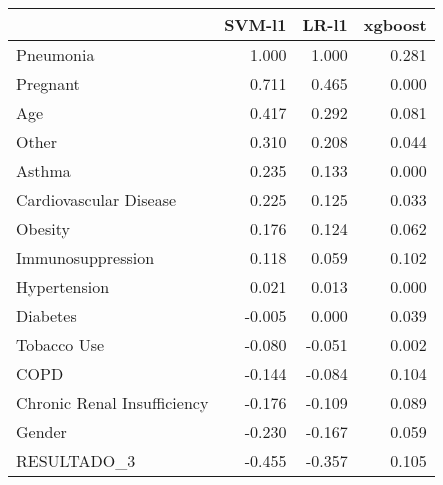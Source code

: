\begin{tabular}{lrrr}
\toprule
{} &  SVM-l1 &  LR-l1 &  xgboost \\
\midrule
Pneumonia                   &   1.000 &  1.000 &    0.281 \\
Pregnant                    &   0.711 &  0.465 &    0.000 \\
Age                         &   0.417 &  0.292 &    0.081 \\
Other                       &   0.310 &  0.208 &    0.044 \\
Asthma                      &   0.235 &  0.133 &    0.000 \\
Cardiovascular Disease      &   0.225 &  0.125 &    0.033 \\
Obesity                     &   0.176 &  0.124 &    0.062 \\
Immunosuppression           &   0.118 &  0.059 &    0.102 \\
Hypertension                &   0.021 &  0.013 &    0.000 \\
Diabetes                    &  -0.005 &  0.000 &    0.039 \\
Tobacco Use                 &  -0.080 & -0.051 &    0.002 \\
COPD                        &  -0.144 & -0.084 &    0.104 \\
Chronic Renal Insufficiency &  -0.176 & -0.109 &    0.089 \\
Gender                      &  -0.230 & -0.167 &    0.059 \\
RESULTADO\_3                 &  -0.455 & -0.357 &    0.105 \\
\bottomrule
\end{tabular}
